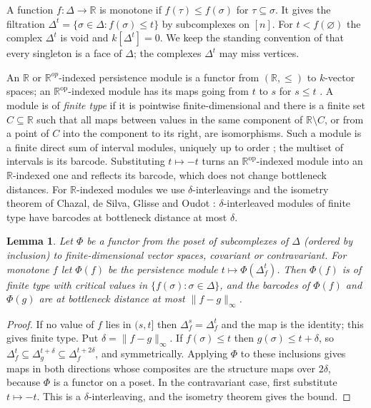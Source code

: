 \documentclass[11pt]{article}
\theoremstyle{plain}
\newtheorem{lemma}[theorem]{Lemma}
\theoremstyle{definition}
\newcommand{\kk}{k}
\newcommand{\RR}{\mathbb{R}}
\begin{document}
A function $f\colon\Delta\to\RR$ is monotone if $f(\tau)\le f(\sigma)$ for $\tau\subseteq\sigma$. It gives
the filtration $\Delta^t=\{\sigma\in\Delta:f(\sigma)\le t\}$ by subcomplexes on $[n]$. For
$t<f(\varnothing)$ the complex $\Delta^t$ is void and $\kk[\Delta^t]=0$. We keep the standing convention of
\cite{HeSuwayyidWei} that every singleton is a face of $\Delta$; the complexes $\Delta^t$ may miss vertices.

An $\RR$ or $\RR^{op}$-indexed persistence module is a functor from $(\RR,\le)$ to $\kk$-vector spaces; an
$\RR^{\mathrm{op}}$-indexed module has its maps going from $t$ to $s$ for $s\le t$ \cite{BubenikScott}. A
module is of \textit{finite type} if it is pointwise finite-dimensional and there is a finite set $C\subseteq\RR$
such that all maps between values in the same component of $\RR\setminus C$, or from a point of $C$ into
the component to its right, are isomorphisms. Such a module is a finite direct sum of interval modules,
uniquely up to order \cite{CrawleyBoevey}; the multiset of intervals is its barcode. Substituting
$t\mapsto-t$ turns an $\RR^{\mathrm{op}}$-indexed module into an $\RR$-indexed one and reflects its barcode,
which does not change bottleneck distances. For $\RR$-indexed modules we use $\delta$-interleavings and the
isometry theorem of Chazal, de Silva, Glisse and Oudot \cite{ChazalDeSilvaGlisseOudot}: $\delta$-interleaved
modules of finite type have barcodes at bottleneck distance at most $\delta$.

\begin{lemma}\label{lem:functor-stability}
Let $\Phi$ be a functor from the poset of subcomplexes of $\Delta$ (ordered by inclusion) to finite-dimensional
vector spaces, covariant or contravariant. For monotone $f$ let $\Phi(f)$ be the persistence module
$t\mapsto\Phi(\Delta^t_f)$. Then $\Phi(f)$ is of finite type with critical values in $\{f(\sigma):\sigma\in\Delta\}$,
and the barcodes of $\Phi(f)$ and $\Phi(g)$ are at bottleneck distance at most $\|f-g\|_\infty$.
\end{lemma}

\begin{proof}
If no value of $f$ lies in $(s,t]$ then $\Delta^s_f=\Delta^t_f$ and the map is the identity; this gives
finite type. Put $\delta=\|f-g\|_\infty$. If $f(\sigma)\le t$ then $g(\sigma)\le t+\delta$, so
$\Delta^t_f\subseteq\Delta^{t+\delta}_g\subseteq\Delta^{t+2\delta}_f$, and symmetrically. Applying $\Phi$ to
these inclusions gives maps in both directions whose composites are the structure maps over $2\delta$,
because $\Phi$ is a functor on a poset. In the contravariant case, first substitute $t\mapsto-t$. This is
a $\delta$-interleaving, and the isometry theorem gives the bound.
\end{proof}
\end{document}
